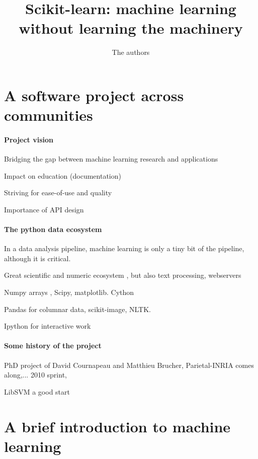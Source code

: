 \documentclass{article}
\begin{document}
\title{Scikit-learn: machine learning without learning the machinery}

\author{The authors}

\maketitle

\section{A software project across communities}

\paragraph{Project vision}
%
Bridging the gap between machine learning research and applications

\cite{pedregosa2011}

Impact on education (documentation)

Striving for ease-of-use and quality

Importance of API design \cite{buitinck2013ecml}

\paragraph{The python data ecosystem}
%
In a data analysis pipeline, machine learning is only a tiny bit of the
pipeline, although it is critical.

Great scientific and numeric ecosystem
\cite{oliphant2007python,varoquaux2013scipy}, but also text processing,
webservers

Numpy arrays \cite{vanderwalt2011}, Scipy, matplotlib. Cython
\cite{behnel2011cython}

Pandas for columnar data, scikit-image, NLTK.

Ipython for interactive work \cite{perez2007ipython}

\paragraph{Some history of the project}
%
PhD project of David Cournapeau and Matthieu Brucher, Parietal-INRIA
comes along,... 2010 sprint, 

LibSVM a good start
\cite{chang2011libsvm}

\section{A brief introduction to machine learning}
\end{document}
